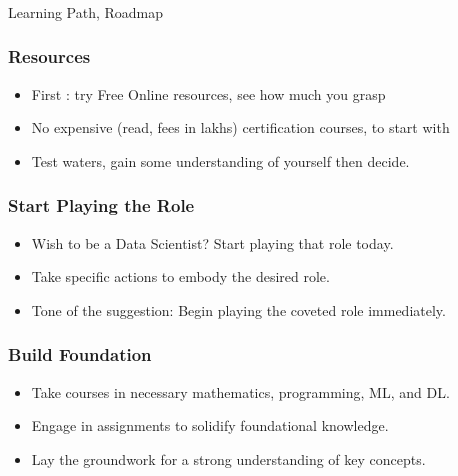 \begin{frame}[fragile]\frametitle{}
	
	\begin{center}
	{\Large Learning Path, Roadmap}  
	\end{center}

\end{frame}


\begin{frame}[fragile]\frametitle{Resources}

      \begin{itemize}
			\item First : try Free Online resources, see how much you grasp
			\item No expensive (read, fees in lakhs) certification courses, to start with
			\item Test waters, gain some understanding of yourself then decide.
			\end{itemize}
			
\end{frame}

\begin{frame}[fragile]\frametitle{Start Playing the Role}


        \begin{itemize}
            \item Wish to be a Data Scientist? Start playing that role today.
            \item Take specific actions to embody the desired role.
            \item Tone of the suggestion: Begin playing the coveted role immediately.
        \end{itemize}
			
\end{frame}

\begin{frame}[fragile]\frametitle{Build Foundation}


        \begin{itemize}
            \item Take courses in necessary mathematics, programming, ML, and DL.
            \item Engage in assignments to solidify foundational knowledge.
            \item Lay the groundwork for a strong understanding of key concepts.
        \end{itemize}
			
\end{frame}


